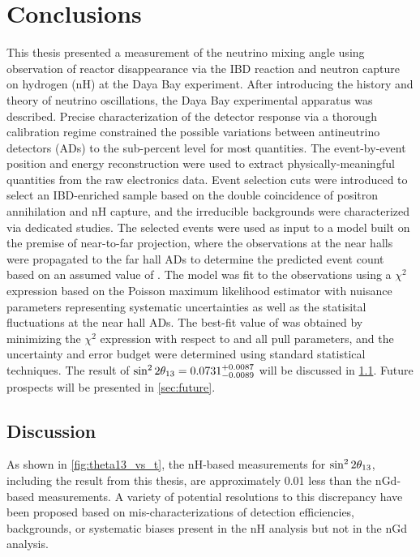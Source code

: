 \chapter{Conclusions}
\label{ch:conclusions}

This thesis presented a measurement of
the neutrino mixing angle \thetaot{}
using observation of reactor \nuebar{} disappearance
via the IBD reaction and neutron capture on hydrogen (nH)
at the Daya Bay experiment.
After introducing the history and theory of neutrino oscillations,
the Daya Bay experimental apparatus was described.
Precise characterization of the detector response
via a thorough calibration regime
constrained the possible variations between antineutrino detectors (ADs)
to the sub-percent level for most quantities.
The event-by-event position and energy reconstruction were used
to extract physically-meaningful quantities from the raw electronics data.
Event selection cuts were introduced to select an IBD-enriched sample
based on the double coincidence of positron annihilation and nH capture,
and the irreducible backgrounds were characterized via dedicated studies.
The selected events were used as input to a model
built on the premise of near-to-far projection,
where the observations at the near halls
were propagated to the far hall ADs
to determine the predicted event count based on an assumed value of \thetaot{}.
The model was fit to the observations using a $\chi^2$ expression
based on the Poisson maximum likelihood estimator
with nuisance parameters representing systematic uncertainties
as well as the statisital fluctuations at the near hall ADs.
The best-fit value of \thetaot{} was obtained by minimizing the $\chi^2$ expression
with respect to \thetaot{} and all pull parameters,
and the uncertainty and error budget were determined
using standard statistical techniques.
The result of $\sin^22\theta_{13} = 0.0731^{+0.0087}_{-0.0089}$
will be discussed in \cref{sec:discussion}.
Future prospects will be presented in \cref{sec:future}.

\section{Discussion}
\label{sec:discussion}

As shown in \cref{fig:theta13_vs_t}, the nH-based measurements for $\sin^22\theta_{13}{}$,
including the result from this thesis, are approximately 0.01
less than the nGd-based measurements.
A variety of potential resolutions to this discrepancy have been proposed
based on mis-characterizations of detection efficiencies, backgrounds,
or systematic biases present in the nH analysis but not in the nGd analysis.


